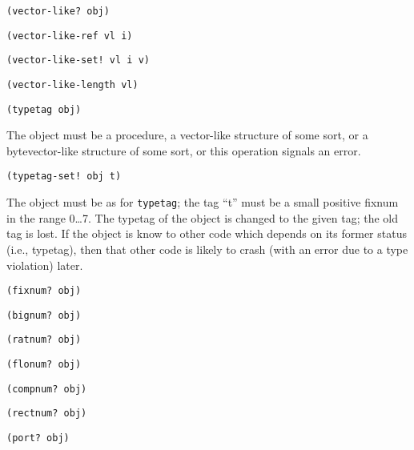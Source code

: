 \begin{description}
\item {\verb+(vector-like? obj)+}

\item {\verb+(vector-like-ref vl i)+}

\item {\verb+(vector-like-set! vl i v)+}

\item {\verb+(vector-like-length vl)+}

\item {\verb+(typetag obj)+}

The object must be a procedure, a vector-like structure of some sort, or a
bytevector-like structure of some sort, or this operation signals an error.

\item {\verb+(typetag-set! obj t)+}

The object must be as for {\tt typetag}; the tag ``t'' must be a small
positive fixnum in the range 0\ldots 7. The typetag of the object is changed
to the given tag; the old tag is lost. If the object is know to other
code which depends on its former status (i.e., typetag), then that other
code is likely to crash (with an error due to a type violation) later.

\item {\verb+(fixnum? obj)+}

\item {\verb+(bignum? obj)+}

\item {\verb+(ratnum? obj)+}

\item {\verb+(flonum? obj)+}

\item {\verb+(compnum? obj)+}

\item {\verb+(rectnum? obj)+}

\item {\verb+(port? obj)+}

\end{description}


